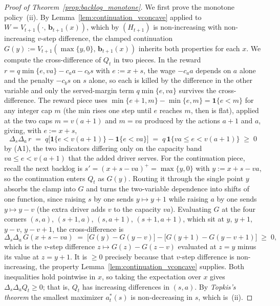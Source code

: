 \documentclass[preprint,11pt,authoryear]{elsarticle}
\newcommand{\bvec}[1]{\mathbf{#1}}
\theoremstyle{remark}
\begin{document}
\begin{proof}[Proof of Theorem~\ref{prop:backlog_monotone}]
We first prove the monotone policy~(ii). By Lemma~\ref{lem:continuation_vconcave} applied to $W = V_{t+1}(\cdot,\,\bvec{b}_{t+1}(x))$, which by $(H_{t+1})$ is non-increasing with non-increasing $v$-step difference, the clamped continuation $G(y) := V_{t+1}(\max\{y,0\},\,\bvec{b}_{t+1}(x))$ inherits both properties for each $x$. We compute the cross-difference of $Q_t$ in two pieces. In the reward $r = q\min\{e,va\} - c_a a - c_b s$ with $e := x+s$, the wage $-c_a a$ depends on $a$ alone and the penalty $-c_b s$ on $s$ alone, so each is killed by the difference in the other variable and only the served-margin term $q\min\{e,va\}$ survives the cross-difference. The reward piece uses $\min\{e+1,m\} - \min\{e,m\} = \mathbf{1}\{e<m\}$ for any integer cap $m$ (the min rises one step until $e$ reaches $m$, then is flat), applied at the two caps $m = v(a+1)$ and $m = va$ produced by the actions $a+1$ and $a$, giving, with $e := x+s$,
\[
\Delta_s \Delta_a\, r \;=\; q\bigl[\mathbf{1}\{e<v(a+1)\} - \mathbf{1}\{e<va\}\bigr] \;=\; q\,\mathbf{1}\{va \le e < v(a+1)\} \;\ge\; 0
\]
by (A1), the two indicators differing only on the capacity band $va \le e < v(a+1)$ that the added driver serves. For the continuation piece, recall the next backlog is $s' = (x+s-va)^+ = \max\{y,0\}$ with $y := x+s-va$, so the continuation enters $Q_t$ as $G(y)$. Routing it through the single point $y$ absorbs the clamp into $G$ and turns the two-variable dependence into shifts of one function, since raising $s$ by one sends $y \mapsto y+1$ while raising $a$ by one sends $y \mapsto y-v$ (the extra driver adds $v$ to the capacity $va$). Evaluating $G$ at the four corners $(s,a)$, $(s{+}1,a)$, $(s,a{+}1)$, $(s{+}1,a{+}1)$, which sit at $y$, $y{+}1$, $y{-}v$, $y{-}v{+}1$, the cross-difference is
\[
\Delta_s \Delta_a\, G(x+s-va) \;=\; \bigl[G(y) - G(y-v)\bigr] - \bigl[G(y+1) - G(y-v+1)\bigr] \;\ge\; 0,
\]
which is the $v$-step difference $z \mapsto G(z)-G(z-v)$ evaluated at $z=y$ minus its value at $z=y+1$. It is $\ge 0$ precisely because that $v$-step difference is non-increasing, the property Lemma~\ref{lem:continuation_vconcave} supplies.
Both inequalities hold pointwise in $x$, so taking the expectation over $x$ gives $\Delta_s \Delta_a Q_t \ge 0$; that is, $Q_t$ has increasing differences in $(s,a)$. By \textit{Topkis's theorem} \citep{topkis1998supermodularity} the smallest maximizer $a^*_t(s)$ is non-decreasing in $s$, which is~(ii).


\end{proof}
\end{document}
